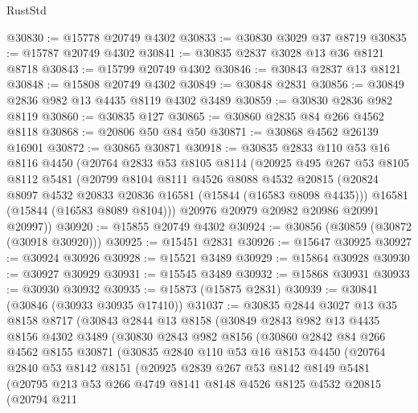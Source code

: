 \begin{lexlean}{RustStd}
\begin{coremodule}
@30830 := @15778 @20749 @4302
@30833 := @30830 @3029 @37 @8719
@30835 := @15787 @20749 @4302
@30841 := @30835 @2837 @3028 @13 @36 @8121 @8718
@30843 := @15799 @20749 @4302
@30846 := @30843 @2837 @13 @8121
@30848 := @15808 @20749 @4302
@30849 := @30848 @2831
@30856 := @30849 @2836 @982 @13 @4435 @8119 @4302 @3489
@30859 := @30830 @2836 @982 @8119
@30860 := @30835 @127
@30865 := @30860 @2835 @84 @266 @4562 @8118
@30868 := @20806 @50 @84 @50
@30871 := @30868 @4562 @26139 @16901
@30872 := @30865 @30871
@30918 := @30835
    @2833
    @110
    @53
    @16
    @8116
    @4450
    (@20764
      @2833
      @53
      @8105
      @8114
      (@20925
        @495
        @267
        @53
        @8105
        @8112
        @5481
        (@20799
          @8104
          @8111
          @4526
          @8088
          @4532
          @20815
          (@20824 @8097 @4532 @20833 @20836 @16581 (@15844 (@16583 @8098 @4435)))
          @16581
          (@15844 (@16583 @8089 @8104)))
        @20976
        @20979
        @20982
        @20986
        @20991
        @20997))
@30920 := @15855 @20749 @4302
@30924 := @30856 (@30859 (@30872 (@30918 @30920)))
@30925 := @15451 @2831
@30926 := @15647 @30925
@30927 := @30924 @30926
@30928 := @15521 @3489
@30929 := @15864 @30928
@30930 := @30927 @30929
@30931 := @15545 @3489
@30932 := @15868 @30931
@30933 := @30930 @30932
@30935 := @15873 (@15875 @2831)
@30939 := @30841 (@30846 (@30933 @30935 @17410))
@31037 := @30835
    @2844
    @3027
    @13
    @35
    @8158
    @8717
    (@30843
      @2844
      @13
      @8158
      (@30849
        @2843
        @982
        @13
        @4435
        @8156
        @4302
        @3489
        (@30830
          @2843
          @982
          @8156
          (@30860
            @2842
            @84
            @266
            @4562
            @8155
            @30871
            (@30835
              @2840
              @110
              @53
              @16
              @8153
              @4450
              (@20764
                @2840
                @53
                @8142
                @8151
                (@20925
                  @2839
                  @267
                  @53
                  @8142
                  @8149
                  @5481
                  (@20795
                    @213
                    @53
                    @266
                    @4749
                    @8141
                    @8148
                    @4526
                    @8125
                    @4532
                    @20815
                    (@20794
                      @211

\end{coremodule}
\end{lexlean}
